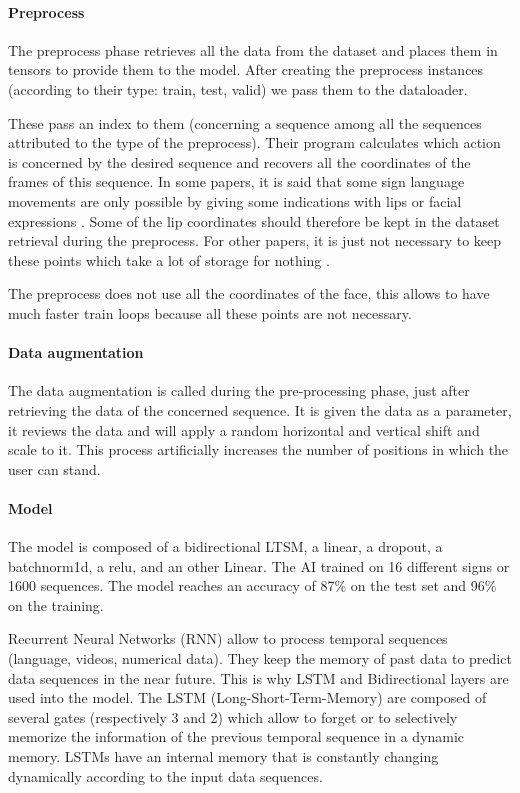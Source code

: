 \paragraph{Preprocess}

The preprocess phase retrieves all the data from the dataset and places them in tensors to provide them to the model.
After creating the preprocess instances (according to their type: train, test, valid) we pass them to the dataloader. 

These pass an index to them (concerning a sequence among all the sequences attributed to the type of the preprocess). Their program calculates which action is concerned by the desired sequence and recovers all the coordinates of the frames of this sequence. 
In some papers, it is said that some sign language movements are only possible by giving some indications with lips or facial expressions \cite{cooper2011sign}. Some of the lip coordinates should therefore be kept in the dataset retrieval during the preprocess. For other papers, it is just not necessary to keep these points which take a lot of storage for nothing \cite{dreuw2007speech}.

The preprocess does not use all the coordinates of the face, this allows to have much faster train loops because all these points are not necessary.

\paragraph{Data augmentation}

The data augmentation is called during the pre-processing phase,
just after retrieving the data of the concerned sequence. It is given
the data as a parameter, it reviews the data and will apply a random
horizontal and vertical shift and scale to it. This process artificially
increases the number of positions in which the user can stand.

\paragraph{Model}

The model is composed of a bidirectional LTSM, a linear, a dropout, a batchnorm1d, a relu, and an other Linear. The AI trained on 16 different signs or 1600 sequences. The model reaches an accuracy of 87\% on the test set and 96\% on the training.

Recurrent Neural Networks (RNN) allow to process temporal sequences (language, videos, numerical data). They keep the memory of past data to predict data sequences in the near future. This is why LSTM and Bidirectional layers are used into the model. The LSTM (Long-Short-Term-Memory) are composed of several gates (respectively 3 and 2) which allow to forget or to selectively memorize the information of the previous temporal sequence in a dynamic memory.
LSTMs have an internal memory that is constantly changing dynamically according to the input data sequences.

